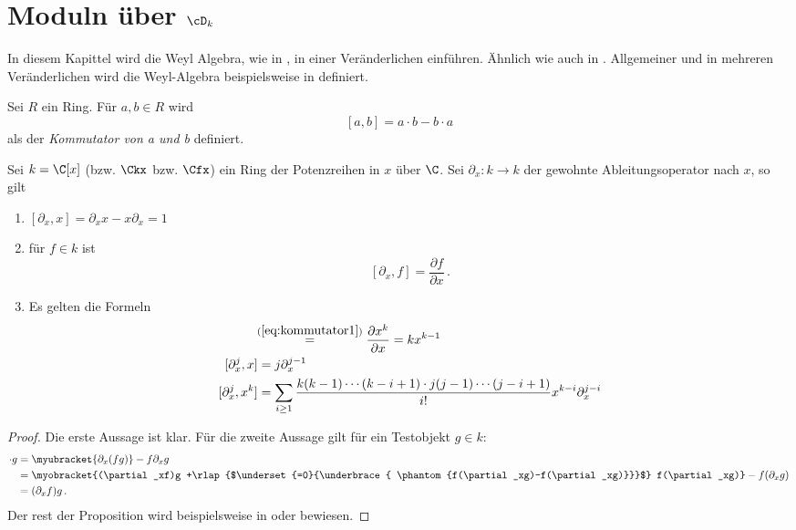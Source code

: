 
\chapter{Moduln über $\cD_k$}
In diesem Kapittel wird die Weyl Algebra, wie in
\cite[Chapter~1]{sabbah_cimpa90}, in einer Veränderlichen einführen. Ähnlich
wie auch in \cite[Kapittel~2]{ZulaBarbara}. Allgemeiner und in
mehreren Veränderlichen wird die Weyl-Algebra beispielsweise in
\cite[Chapter~1]{coutinho1995primer} definiert.

\begin{defn}[Kommutator]%
Sei $R$ ein Ring. Für $a,b\in R$ wird
\[[a,b]=a\cdot b-b\cdot a\]
als der \emph{Kommutator von a und b} definiert.
\end{defn}

\begin{prop} \label{prop:d-modul-komutator-regeln}
Sei $k= \C[x]$ (bzw. $\Ckx$ bzw. $\Cfx$) ein Ring der Potenzreihen in $x$ über
$\C$. Sei $\partial_x:k\rightarrow k$ der gewohnte Ableitungsoperator nach $x$,
so gilt 
\begin{enumerate}
\item $[ \partial_x,x] = \partial_xx-x\partial_x=1 $
\item für $f\in k$ ist
\begin{equation} \label{eq:kommutator1}
[\partial_x,f] = \frac{\partial f}{\partial x} \,. 
\end{equation}
\item Es gelten die Formeln
\begin{align}
[\partial_x,x^k] &\!\!\overset{(\ref{eq:kommutator1})}{=}
  \frac{\partial x^k}{\partial x} = kx^{k-1}
  \label{eq:kommutator1b}\\
[\partial_x^j,x]   &= j\partial_x^{j-1}
  \label{eq:kommutator2}\\
[\partial_x^j,x^k] &= \sum_{i\geq1}\frac{k(k-1)\cdots(k-i+1)
  \cdot j(j-1)\cdots(j-i+1)}{i!}x^{k-i}\partial_x^{j-i}
  \label{eq:kommutator3}
\end{align}
\end{enumerate}
\end{prop}
\begin{proof}
Die erste Aussage ist klar. Für die zweite Aussage gilt für ein Testobjekt
$g\in k$:
\begin{align*}
[\partial_x,f]\cdot g&=\myubracket{\partial_x(fg)}-f\partial_xg
\\&= \myobracket{(\partial_xf)g
  +\rlap{$\underset{=0}{\underbrace{ \phantom{f(\partial_xg)-f(\partial_xg)}}}$}
  f(\partial_xg)}-f(\partial_xg)
\\&= (\partial_xf)g \,.
\end{align*}
Der rest der Proposition wird beispielsweise in \cite[1.2.4.]{sabbah_cimpa90}
oder \cite[Kor 2.8]{ZulaBarbara} bewiesen.
\end{proof}

